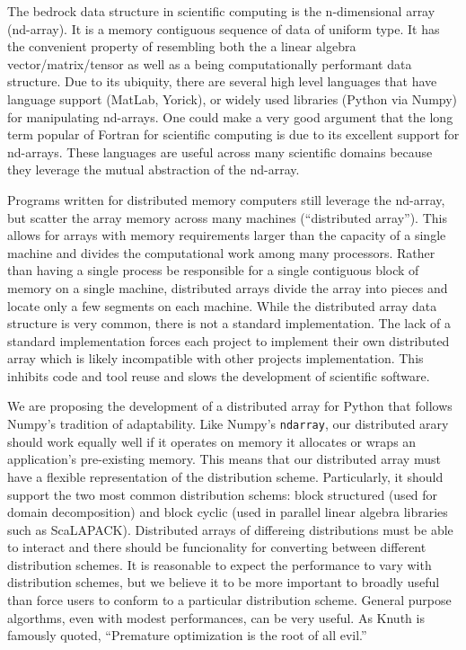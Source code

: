 \documentclass[a4paper]{article}
\begin{document}
The bedrock data structure in scientific computing is the n-dimensional array (nd-array).  It is a memory contiguous sequence of data of uniform type.  It has the convenient property of resembling both the a linear algebra vector/matrix/tensor as well as a being computationally performant data structure.  Due to its ubiquity, there are several high level languages that have language support (MatLab\cite{matlab}, Yorick\cite{Munro1995}), or widely used libraries (Python\cite{CPython} via Numpy\cite{Oliphant2006}) for manipulating nd-arrays.  One could make a very good argument that the long term popular of Fortran for scientific computing is due to its excellent support for nd-arrays.  These languages are useful across many scientific domains because they leverage the mutual abstraction of the nd-array.

Programs written for distributed memory computers still leverage the nd-array, but scatter the array memory across many machines (``distributed array'').  This allows for arrays with memory requirements larger than the capacity of a single machine and divides the computational work among many processors.  Rather than having a single process be responsible for a single contiguous block of memory on a single machine, distributed arrays divide the array into pieces and locate only a few segments on each machine.  While the distributed array data structure is very common, there is not a standard implementation.  The lack of a standard implementation forces each project to implement their own distributed array which is likely incompatible with other projects implementation.  This inhibits code and tool reuse and slows the development of scientific software.

We are proposing the development of a distributed array for Python that follows Numpy's tradition of adaptability.  Like Numpy's \texttt{ndarray}, our distributed arary should work equally well if it operates on memory it allocates or wraps an application's pre-existing memory.  This means that our distributed array must have a flexible representation of the distribution scheme.  Particularly, it should support the two most common distribution schems: block structured (used for domain decomposition) and block cyclic (used in parallel linear algebra libraries such as ScaLAPACK\cite{scalapack}).  Distributed arrays of differeing distributions must be able to interact and there should be funcionality for converting between different distribution schemes.  It is reasonable to expect the performance to vary with distribution schemes, but we believe it to be more important to broadly useful than force users to conform to a particular distribution scheme.  General purpose algorthms, even with modest performances, can be very useful.  As Knuth is famously quoted, ``Premature optimization is the root of all evil.''\cite{Knuth1974}
\end{document}
